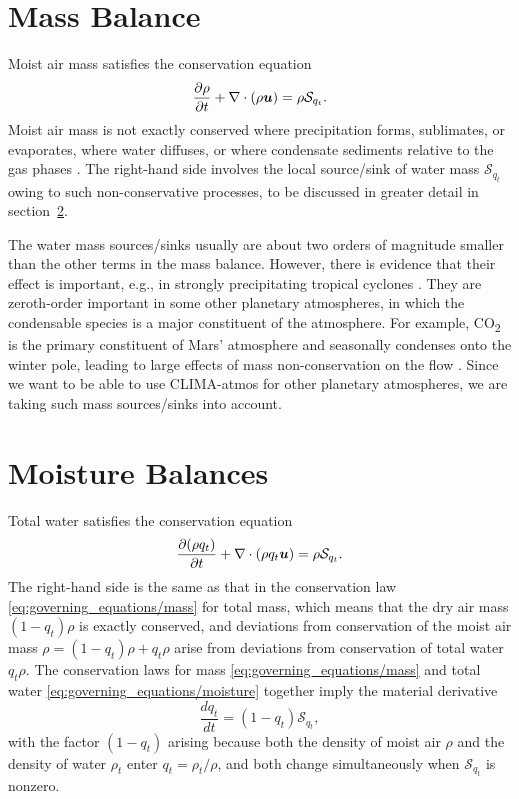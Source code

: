 \documentclass{report}
\begin{document}
\section{Mass Balance}

Moist air mass satisfies the conservation equation
\begin{equation}
\frac{\partial \rho}{\partial t} + \nabla \cdot (\rho\boldsymbol{{u}}) = \rho \mathcal{S}_{q_t}.
\label{eq:governing_equations/mass}
\end{equation}
Moist air mass is not exactly conserved where precipitation forms, sublimates, or evaporates, where water diffuses, or where condensate sediments relative to the gas phases \citep{Bott08a, Romps08a}. The  right-hand side involves the local source/sink of water mass $\mathcal{S}_{q_t}$ owing to such non-conservative processes, to be discussed in greater detail in section~\ref{s:moisture_balance}.

The water mass sources/sinks usually are about two orders of magnitude smaller than the other terms in the mass balance. However, there is evidence that their effect is important, e.g., in strongly precipitating tropical cyclones \citep{Qiu93a,Lackmann04a}. They are zeroth-order important in some other planetary atmospheres, in which the condensable species is a major constituent of the atmosphere. For example, CO\textsubscript{2} is the primary constituent of Mars' atmosphere and seasonally condenses onto the winter pole, leading to large effects of mass non-conservation on the flow \cite[e.g.,][]{Soto15a}. Since we want to be able to use CLIMA-atmos for other planetary atmospheres, we are taking such mass sources/sinks into account.

\section{Moisture Balances}\label{s:moisture_balance}

Total water satisfies the conservation equation
\begin{equation}
\frac{\partial (\rho q_t)}{\partial t} + \nabla \cdot (\rho q_t \boldsymbol{{u}}) = \rho \mathcal{S}_{q_t}.   
\label{eq:governing_equations/moisture}
\end{equation}
The right-hand side is the same as that in the conservation law \eqref{eq:governing_equations/mass} for total mass, which means that the dry air mass $(1-q_t)\rho$ is exactly conserved, and deviations from conservation of the moist air mass $\rho = (1-q_t)\rho + q_t \rho$ arise from deviations from conservation of total water $q_t\rho$. The conservation laws for mass \eqref{eq:governing_equations/mass} and total water \eqref{eq:governing_equations/moisture} together imply the material derivative 
\[
\frac{dq_t}{dt} = (1-q_t) \mathcal{S}_{q_t},
\]
with the factor $(1-q_t)$ arising because both the density of moist air $\rho$ and the density of water $\rho_t$ enter $q_t = \rho_t/\rho$, and both change simultaneously when $\mathcal{S}_{q_t}$ is nonzero.
\end{document}

